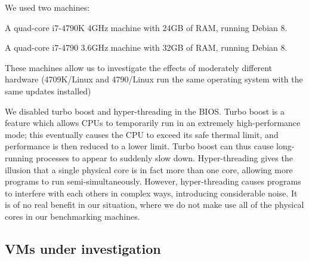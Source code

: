 \documentclass[a4paper,UKenglish]{lipics}
\newcommand{\hyptwo}{H2\xspace}
\newcommand{\bencherthree}{4709K/Linux\xspace}
\newcommand{\bencherfive}{4790/Linux\xspace}
\newcommand{\benchersix}{4790/OpenBSD\xspace}
\begin{document}
We used two machines:
\begin{description*}
  \item[\bencherthree] A quad-core i7-4790K 4GHz machine with 24GB of RAM, running Debian 8.
  \item[\bencherfive] A quad-core i7-4790 3.6GHz machine with 32GB of RAM, running Debian 8.
\end{description*}
These machines allow us to investigate the effects of moderately different
hardware (\bencherthree and \bencherfive run the same operating system with the
same updates installed)

We disabled turbo boost and hyper-threading in the BIOS. Turbo boost is a
feature which allows CPUs to temporarily run in an extremely high-performance
mode; this eventually causes the CPU to exceed its safe thermal limit, and
performance is then reduced to a lower limit. Turbo boost can thus cause long-running processes to
appear to suddenly slow down. Hyper-threading gives the illusion that a single
physical core is in fact more than one core, allowing more programs to
run semi-simultaneously. However, hyper-threading causes programs to interfere
with each others in complex ways, introducing considerable noise. It
is of no real benefit in our situation, where we do not make use all of the
physical cores in our benchmarking machines.


\subsection{VMs under investigation}
\end{document}
